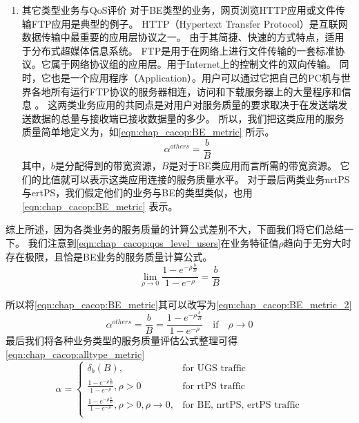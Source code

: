 \begin{enumerate}[(1)]
\item 其它类型业务与QoS评价
对于BE类型的业务，网页浏览HTTP应用或文件传输FTP应用是典型的例子。
HTTP（Hypertext Transfer Protocol）是互联网数据传输中最重要的应用层协议之一\cite{Fielding_1999}。 
由于其简捷、快速的方式特点，适用于分布式超媒体信息系统。
FTP是用于在网络上进行文件传输的一套标准协议。它属于网络协议组的应用层。用于Internet上的控制文件的双向传输。
同时，它也是一个应用程序（Application）。用户可以通过它把自己的PC机与世界各地所有运行FTP协议的服务器相连，访问和下载服务器上的大量程序和信息 \cite{Postel_Reynolds_1985}。
这两类业务应用的共同点是对用户对服务质量的要求取决于在发送端发送数据的总量与接收端已接收数据量的多少。
所以，我们把这类应用的服务质量简单地定义为，如\eqref{eqn:chap_cacop:BE_metric} 所示。
%
\begin{equation}
\label{eqn:chap_cacop:BE_metric}
\alpha^{others} = \frac{b}{B}
\end{equation}
%
其中，$b$是分配得到的带宽资源，$B$是对于BE类应用而言所需的带宽资源。
它们的比值就可以表示这类应用连接的服务质量水平。
对于最后两类业务nrtPS与ertPS，我们假定他们的业务与BE的类型类似，也用 \eqref{eqn:chap_cacop:BE_metric} 表示。
\end{enumerate}

综上所述，因为各类业务的服务质量的计算公式差别不大，下面我们将它们总结一下。
我们注意到\eqref{eqn:chap_cacop:qos_level_users}在业务特征值$\rho$趋向于无穷大时存在极限，且恰是BE业务的服务质量计算公式。
%
\begin{equation}
\label{eqn:BE_limit}
\lim\limits_{\rho \to 0 } \frac{1- e^{-\rho \frac{b}{B} }}{1-e^{-\rho}} = \frac{b}{B}
\end{equation}

所以将\eqref{eqn:chap_cacop:BE_metric}其可以改写为\eqref{eqn:chap_cacop:BE_metric_2}
%
\begin{equation}
\label{eqn:chap_cacop:BE_metric_2}
\alpha^{others} = \frac{b}{B} = \frac{1- e^{-\rho \frac{b}{B} }}{1-e^{-\rho}} \quad \text{if} \quad \rho \to 0
\end{equation}
%
最后我们将各种业务类型的服务质量评估公式整理可得 \eqref{eqn:chap_cacop:alltype_metric}
%
\begin{equation}
\alpha = 
\begin{cases}
\delta_{b}(B), &\text{for UGS traffic} \\
\frac{1- e^{-\rho \frac{b}{B} }}{1-e^{-\rho}}, \rho > 0& \text{for rtPS traffic}\\
\frac{1- e^{-\rho \frac{b}{B} }}{1-e^{-\rho}}, \rho>0, \rho \to 0, &\text{for BE, nrtPS, ertPS traffic}\\
\end{cases}
\label{eqn:chap_cacop:alltype_metric}
\end{equation}
